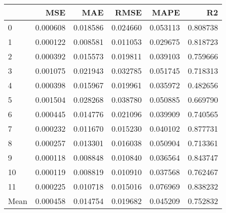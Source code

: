 \begin{tabular}{lrrrrr}
\toprule
 & MSE & MAE & RMSE & MAPE & R2 \\
\midrule
0 & 0.000608 & 0.018586 & 0.024660 & 0.053113 & 0.808738 \\
1 & 0.000122 & 0.008581 & 0.011053 & 0.029675 & 0.818723 \\
2 & 0.000392 & 0.015573 & 0.019811 & 0.039103 & 0.759666 \\
3 & 0.001075 & 0.021943 & 0.032785 & 0.051745 & 0.718313 \\
4 & 0.000398 & 0.015967 & 0.019961 & 0.035972 & 0.482656 \\
5 & 0.001504 & 0.028268 & 0.038780 & 0.050885 & 0.669790 \\
6 & 0.000445 & 0.014776 & 0.021096 & 0.039909 & 0.740565 \\
7 & 0.000232 & 0.011670 & 0.015230 & 0.040102 & 0.877731 \\
8 & 0.000257 & 0.013301 & 0.016038 & 0.050904 & 0.713361 \\
9 & 0.000118 & 0.008848 & 0.010840 & 0.036564 & 0.843747 \\
10 & 0.000119 & 0.008819 & 0.010910 & 0.037568 & 0.762467 \\
11 & 0.000225 & 0.010718 & 0.015016 & 0.076969 & 0.838232 \\
Mean & 0.000458 & 0.014754 & 0.019682 & 0.045209 & 0.752832 \\
\bottomrule
\end{tabular}

